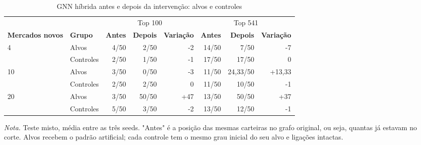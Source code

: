 \begin{table}[htbp]
\centering
\small
\caption{GNN híbrida antes e depois da intervenção: alvos e controles}
\label{tab:t4}
\begin{tabular}{llrrrrrr}
\toprule
 &  & \multicolumn{3}{c}{Top 100} & \multicolumn{3}{c}{Top 541} \\
\cmidrule(lr){3-5} \cmidrule(lr){6-8}
\textbf{Mercados novos} & \textbf{Grupo} & \textbf{Antes} & \textbf{Depois} & \textbf{Variação} & \textbf{Antes} & \textbf{Depois} & \textbf{Variação} \\
\midrule
4 & Alvos & 4/50 & 2/50 & -2 & 14/50 & 7/50 & -7 \\
 & Controles & 2/50 & 1/50 & -1 & 17/50 & 17/50 & 0 \\
\midrule
10 & Alvos & 3/50 & 0/50 & -3 & 11/50 & 24,33/50 & +13,33 \\
 & Controles & 2/50 & 2/50 & 0 & 11/50 & 10/50 & -1 \\
\midrule
20 & Alvos & 3/50 & 50/50 & +47 & 13/50 & 50/50 & +37 \\
 & Controles & 5/50 & 3/50 & -2 & 13/50 & 12/50 & -1 \\
\bottomrule
\end{tabular}
\par\smallskip\parbox{\linewidth}{\scriptsize\textit{Nota.} Teste misto, média entre as três seeds. "Antes" é a posição das mesmas carteiras no grafo original, ou seja, quantas já estavam no corte. Alvos recebem o padrão artificial; cada controle tem o mesmo grau inicial do seu alvo e ligações intactas.}
\end{table}
